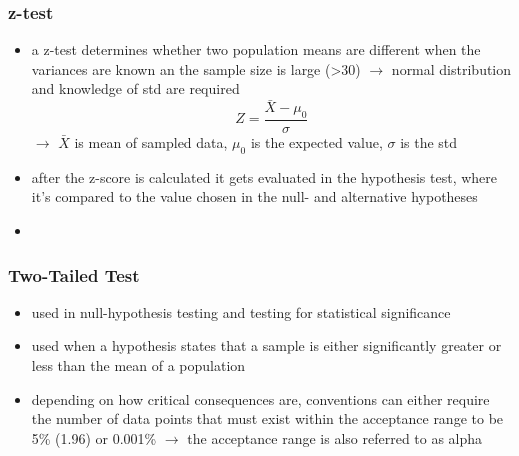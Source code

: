 \documentclass[12pt,a4paper]{article}
\begin{document}
\subsubsection{z-test} %
\label{ssub:z_test}
\begin{itemize}
  \item a z-test determines whether two population means are different when the variances are known an the sample size is large (>30)
  \newline \indent $\longrightarrow$ normal distribution and knowledge of std are required
  \begin{equation}
    Z = \frac{\bar X - \mu_0}{\sigma}
  \end{equation}
  \newline \indent $\longrightarrow$ $\bar X$ is mean of sampled data, $\mu_0$ is the expected value, $\sigma$ is the std
  \item after the z-score is calculated it gets evaluated in the hypothesis test, where it's compared to the value chosen in the null- and alternative hypotheses 
  \item 
\end{itemize}

\subsubsection{Two-Tailed Test} %
\label{ssub:two_tailed_test}
\begin{itemize}
  \item used in null-hypothesis testing and testing for statistical significance
  \item used when a hypothesis states that a sample is either significantly greater or less than the mean of a population
  \item depending on how critical consequences are, conventions can either require the number of data points that must exist within the acceptance range to be 5\% (1.96) or 0.001\%
  \newline \indent $\longrightarrow$ the acceptance range is also referred to as alpha
\end{itemize}
\end{document}
